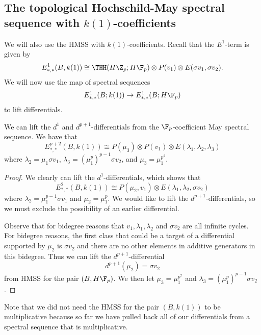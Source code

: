 \subsection{The topological Hochschild-May spectral sequence with $k(1)$-coefficients}

We will also use the HMSS with $k(1)$-coefficients. Recall that the $E^1$-term is given by
\[
E_{*,*}^1(B,k(1))\cong \THH(H\Z_p;H\F_p)\otimes P (v_1)\otimes E(\sigma v_1, \sigma v_2). 
\]
We will now use the map of spectral sequences
\[ E_{*,*}^1(B;k(1))\to E_{*,*}^1(B;H\F_p)\]
to lift differentials.
\begin{prop}
	We can lift the $d^1$ and $d^{p+1}$-differentials from the $\F_p$-coefficient May spectral sequence. We have that 
	\[
	E^{p+2}_{*,*}(B,k(1))\cong P(\mu_3)\otimes P(v_1)\otimes E(\lambda_1, \lambda_2, \lambda_3)
	\]
	where $\lambda_2 = \mu_1\sigma v_1$, $\lambda_3 = (\mu_1^p)^{p-1}\sigma v_2$, and $\mu_3 = \mu_1^{p^2}$. 
\end{prop}
\begin{proof}
	We clearly can lift the $d^1$-differentials, which shows that 
	\[
	E_{*,*}^2(B,k(1))\cong P(\mu_2,v_1)\otimes E(\lambda_1, \lambda_2, \sigma v_2)
	\]
	where $\lambda_2 = \mu_1^{p-1}\sigma v_1$ and $\mu_2=\mu_1^p$. We would like to lift the $d^{p+1}$-differentials, so we must exclude the possibility of an earlier differential. 
	
	Observe that for bidegree reasons that $v_1, \lambda_1, \lambda_2$ and $\sigma v_2$ are all infinite cycles. For bidegree reasons, the first class that could be a target of a differential supported by $\mu_2$ is $\sigma v_2$ and there are no other elements in additive generators in this bidegree. Thus we can lift the $d^{p+1}$-differential 
	\[ d^{p+1}(\mu_2)=\sigma v_2\]	
	from HMSS for the pair $(B,H\F_p)$. We then let $\mu_3=\mu_1^{p^2}$ and $\lambda_3=(\mu_1^p)^{p-1}\sigma v_2$.
\end{proof}
\begin{rem}
Note that we did not need the HMSS for the pair $(B,k(1))$ to be multiplicative because so far we have pulled back all of our differentials from a spectral sequence that is multiplicative. %
\end{rem}

